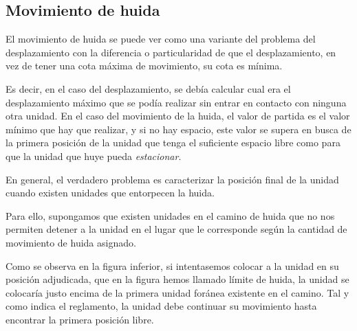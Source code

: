 \subsection{Movimiento de huida}
El movimiento de huida se puede ver como una variante del problema del
desplazamiento con la diferencia o particularidad de que el
desplazamiento, en vez de tener una cota máxima de movimiento, su cota
es mínima.

Es decir, en el caso del desplazamiento, se debía calcular cual era el
desplazamiento máximo que se podía realizar sin entrar en contacto con
ninguna otra unidad. En el caso del movimiento de la huida, el valor
de partida es el valor mínimo que hay que realizar, y si no hay
espacio, este valor se supera en busca de la primera posición de la
unidad que tenga el suficiente espacio libre como para que la unidad
que huye pueda \emph{estacionar}.

En general, el verdadero problema es caracterizar la posición final de
la unidad cuando existen unidades que entorpecen la huida.

Para ello, supongamos que existen unidades en el camino de huida que no
nos permiten detener a la unidad en el lugar que le corresponde según
la cantidad de movimiento de huida asignado.

Como se observa en la figura inferior, si intentasemos colocar a la
unidad en su posición adjudicada, que en la figura hemos llamado
límite de huida, la unidad se colocaría justo encima de la primera
unidad foránea existente en el camino. Tal y como indica el
reglamento, la unidad debe continuar su movimiento hasta encontrar la
primera posición libre.


